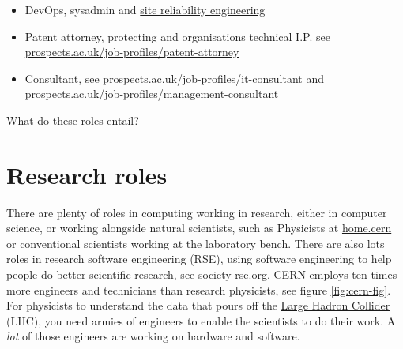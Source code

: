 \documentclass[
]{book}
\begin{document}
\begin{itemize}
\item
  DevOps, sysadmin and \href{https://en.wikipedia.org/wiki/Site_reliability_engineering}{site reliability engineering}
\item
  Patent attorney, protecting and organisations technical I.P. see \href{https://www.prospects.ac.uk/job-profiles/patent-attorney}{prospects.ac.uk/job-profiles/patent-attorney}
\item
  Consultant, see \href{https://www.prospects.ac.uk/job-profiles/it-consultant}{prospects.ac.uk/job-profiles/it-consultant} and \href{https://www.prospects.ac.uk/job-profiles/management-consultant}{prospects.ac.uk/job-profiles/management-consultant}
\end{itemize}

What do these roles entail?

\hypertarget{rse}{%
\section{Research roles}\label{rse}}

There are plenty of roles in computing working in research, either in computer science, or working alongside natural scientists, such as Physicists at \href{https://home.cern/}{home.cern} or conventional scientists working at the laboratory bench. There are also lots roles in research software engineering (RSE), using software engineering to help people do better scientific research, see \href{https://society-rse.org/}{society-rse.org}. CERN employs ten times more engineers and technicians than research physicists, see figure \ref{fig:cern-fig}. For physicists to understand the data that pours off the \href{https://en.wikipedia.org/wiki/Large_Hadron_Collider}{Large Hadron Collider} (LHC), you need armies of engineers to enable the scientists to do their work. A \emph{lot} of those engineers are working on hardware and software.
\end{document}
